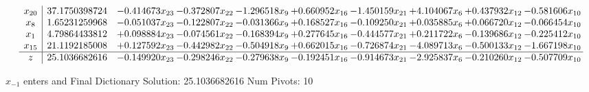 \documentclass[10pt]{article}
\begin{document}
\[\begin{array}{c| c c@{\hskip 2pt} c@{\hskip 2pt} c@{\hskip 2pt} c@{\hskip 2pt} c@{\hskip 2pt} c@{\hskip 2pt} c@{\hskip 2pt} c@{\hskip 2pt} }
 x_{20}   &  37.1750398724 & -0.414673 x_{23} & -0.372807 x_{22} & -1.296518 x_{9} & + 0.660952 x_{16} & -1.450159 x_{21} & + 4.104067 x_{6} & + 0.437932 x_{12} & -0.581606 x_{10}\\
 x_{8}   &  1.65231259968 & -0.051037 x_{23} & -0.122807 x_{22} & -0.031366 x_{9} & + 0.168527 x_{16} & -0.109250 x_{21} & + 0.035885 x_{6} & + 0.066720 x_{12} & -0.066454 x_{10}\\
 x_{1}   &  4.79864433812 & + 0.098884 x_{23} & -0.074561 x_{22} & -0.168394 x_{9} & + 0.277645 x_{16} & -0.444577 x_{21} & + 0.211722 x_{6} & -0.139686 x_{12} & -0.225412 x_{10}\\
 x_{15}   &  21.1192185008 & + 0.127592 x_{23} & -0.442982 x_{22} & -0.504918 x_{9} & + 0.662015 x_{16} & -0.726874 x_{21} & -4.089713 x_{6} & -0.500133 x_{12} & -1.667198 x_{10}\\
\hline
z    &  25.1036682616 & -0.149920 x_{23} & -0.298246 x_{22} & -0.279638 x_{9} & -0.192451 x_{16} & -0.914673 x_{21} & -2.925837 x_{6} & -0.210260 x_{12} & -0.507709 x_{10}\\
\end{array}\]


 $ x_{-1} $ enters and Final Dictionary
Solution:  25.1036682616
Num Pivots:  10
\end{document}
